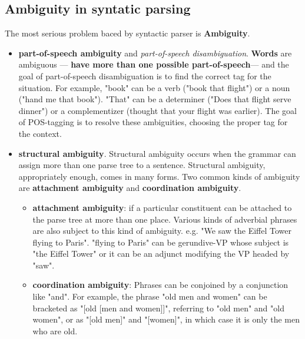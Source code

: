 \documentclass[11pt]{article}
\begin{document}
\subsection{Ambiguity in syntatic parsing}
The most serious problem baced by syntactic parser is \textbf{Ambiguity}. 
\begin{itemize}
\item \textbf{part-of-speech ambiguity} and \emph{part-of-speech disambiguation}. \textbf{Words} are ambiguous — \textbf{have more than one
possible part-of-speech}— and the goal of part-of-speech disambiguation is to find the correct tag for the situation. For example, "book" can be a verb ("book that flight") or a noun ("hand me that book"). "That" can be a determiner ("Does that flight serve dinner") or a complementizer (thought that your flight was earlier). The goal of POS-tagging is to resolve these ambiguities, choosing the proper tag for the context.
\item  \textbf{structural ambiguity}. Structural ambiguity occurs when the grammar can assign more than one parse tree to a sentence. Structural ambiguity, appropriately enough, comes in many forms. Two common kinds of ambiguity are \textbf{attachment ambiguity} and \textbf{coordination ambiguity}.
\begin{itemize}
\item \textbf{attachment ambiguity}: if a particular constituent can be attached to the parse tree at more than one place.  Various kinds of adverbial phrases are also subject to this kind of ambiguity. e.g. "We saw the Eiffel Tower flying to Paris". "flying to Paris" can be gerundive-VP whose subject is "the Eiffel Tower"   or it can be an adjunct modifying the VP headed by "saw".
\item \textbf{coordination ambiguity}: Phrases can be conjoined by a conjunction like "and". For example, the phrase "old men and women" can be bracketed as "[old [men and
women]]", referring to "old men" and "old women", or as "[old men]" and "[women]", in which case it is only the men who are old.
\end{itemize}
\end{itemize}  
\end{document}

